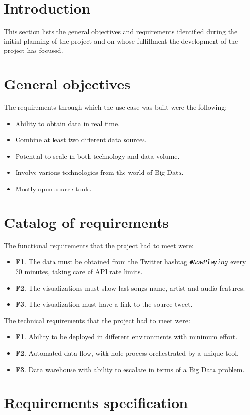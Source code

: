 
\section{Introduction}

\nonzeroparskip This section lists the general objectives and requirements identified during the initial planning of the project and on whose fulfillment the development of the project has focused.

\section{General objectives}

\nonzeroparskip The requirements through which the use case was built were the following:
\begin{itemize}
	\item Ability to obtain data in real time.
	\item Combine at least two different data sources.
	\item Potential to scale in both technology and data volume.
	\item Involve various technologies from the world of Big Data.
	\item Mostly open source tools.
\end{itemize}

\section{Catalog of requirements}

\nonzeroparskip The functional requirements that the project had to meet were:
\begin{itemize}
	\item \textbf{F1}. The data must be obtained from the Twitter hashtag \texttt{\textit{\#NowPlaying}} every 30 minutes, taking care of API rate limits.
	\item \textbf{F2}. The visualizations must show last songs name, artist and audio features.
	\item \textbf{F3}. The visualization must have a link to the source tweet.
\end{itemize}

\nonzeroparskip The technical requirements that the project had to meet were:
\begin{itemize}
	\item \textbf{F1}. Ability to be deployed in different environments with minimum effort.
	\item \textbf{F2}. Automated data flow, with hole process orchestrated by a unique tool.
	\item \textbf{F3}. Data warehouse with ability to escalate in terms of a Big Data problem.
\end{itemize}

\section{Requirements specification}


